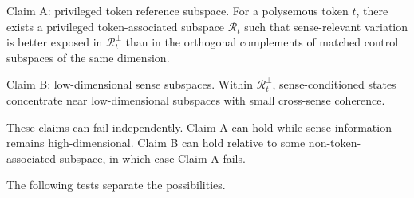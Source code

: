 \documentclass[
  aps,
  reprint,
  superscriptaddress,
  floatfix,
  nofootinbib,
  longbibliography
]{revtex4-2}
\begin{document}
{Claim A: privileged token reference subspace.}
For a polysemous token $t$, there exists a privileged token-associated
subspace $\mathcal R_t$ such that sense-relevant variation is better
exposed in $\mathcal R_t^\perp$ than in the orthogonal complements of
matched control subspaces of the same dimension.

{Claim B: low-dimensional sense subspaces.}
Within $\mathcal R_t^\perp$,
sense-conditioned states concentrate near low-dimensional subspaces
with small cross-sense coherence.

These claims can fail independently. Claim A can hold while sense
information remains high-dimensional. Claim B can hold relative to some
non-token-associated subspace, in which case Claim A fails.

The following tests separate the possibilities.
\end{document}
